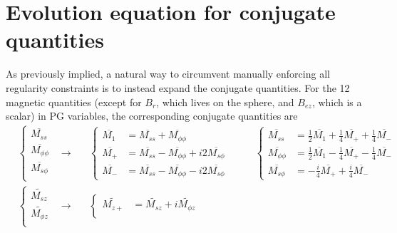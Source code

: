 \section{Evolution equation for conjugate quantities}

As previously implied, a natural way to circumvent manually enforcing all regularity constraints is to instead expand the conjugate quantities.
For the 12 magnetic quantities (except for $B_r$, which lives on the sphere, and $B_{ez}$, which is a scalar) in PG variables, the corresponding conjugate quantities are
\begin{equation}
\begin{aligned}
    &\left\{\begin{aligned}
        \overline{M_{ss}} \\ 
        \overline{M_{\phi\phi}} \\ 
        \overline{M_{s\phi}} \\ 
    \end{aligned}\right. &\longrightarrow \quad 
    &\left\{\begin{aligned}
        \overline{M_1} &= \overline{M_{ss}} + \overline{M_{\phi\phi}} \\ 
        \overline{M_+} &= \overline{M_{ss}} - \overline{M_{\phi\phi}} + i2 \overline{M_{s\phi}} \\ 
        \overline{M_-} &= \overline{M_{ss}} - \overline{M_{\phi\phi}} - i2 \overline{M_{s\phi}}
    \end{aligned}\right. &\quad
    &\left\{\begin{aligned}
        \overline{M_{ss}} &= \frac{1}{2} \overline{M_1} + \frac{1}{4}\overline{M_+} + \frac{1}{4}\overline{M_-} \\ 
        \overline{M_{\phi\phi}} &= \frac{1}{2}\overline{M_1} - \frac{1}{4} \overline{M_+} - \frac{1}{4} \overline{M_-} \\ 
        \overline{M_{s\phi}} &= -\frac{i}{4}\overline{M_+} + \frac{i}{4} \overline{M_-}
    \end{aligned}\right. \\ 
    &\left\{\begin{aligned}
        \widetilde{M_{sz}} \\ 
        \widetilde{M_{\phi z}} \\ 
    \end{aligned}\right. &\longrightarrow \quad 
    &\left\{\begin{aligned}
        \widetilde{M_{z+}} &= \widetilde{M_{sz}} + i\widetilde{M_{\phi z}} \\ 

\end{aligned}
\end{aligned}
\end{equation}
